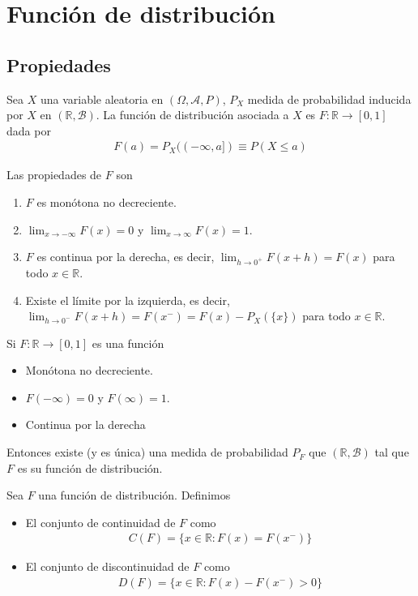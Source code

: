 \chapter{Función de distribución}

\section{Propiedades}
\begin{defi}
Sea $X$ una variable aleatoria en $(\Omega, \mathcal{A}, P)$, $P_X$ medida de probabilidad inducida por $X$ en $(\mathbb{R}, \mathcal{B})$. La función de distribución asociada a $X$ es $F: \mathbb{R} \longrightarrow [0,1]$ dada por
\begin{align*}
    F(a) = P_X((-\infty,a]) \equiv P(X \leq a)
\end{align*}
\end{defi}

\noindent Las propiedades de $F$ son
\begin{enumerate}
    \item $F$ es monótona no decreciente.
    \item $\lim_{x \to - \infty}F(x) = 0$ y $\lim_{x \to \infty}F(x) = 1$.
    \item $F$ es continua por la derecha, es decir, $\lim_{h \to 0^+}F(x+h) = F(x)$ para todo $x \in \mathbb{R}$.
    \item Existe el límite por la izquierda, es decir, $\lim_{h \to 0^-}F(x+h) = F(x^-) = F(x) - P_X(\{x\})$ para todo $x \in \mathbb{R}$.
\end{enumerate}

\begin{teo}[de correspondencia]
    Si $F: \mathbb{R} \longrightarrow [0,1]$ es una función
    \begin{itemize}
        \item Monótona no decreciente.
        \item $F(-\infty) = 0$ y $F(\infty) = 1$.
        \item Continua por la derecha
    \end{itemize}
    Entonces existe (y es única) una medida de probabilidad $P_F$ que $(\mathbb{R}, \mathcal{B})$ tal que $F$ es su función de distribución.
\end{teo}

\begin{defi}
Sea $F$ una función de distribución. Definimos
\begin{itemize}
    \item El conjunto de continuidad de $F$ como
    \begin{align*}
        C(F) = \{ x \in \mathbb{R} : F(x) = F(x^-)\}
    \end{align*}
    \item El conjunto de discontinuidad de $F$ como
    \begin{align*}
        D(F) = \{ x \in \mathbb{R} : F(x) - F(x^-) > 0\}
    \end{align*}
\end{itemize}
\end{defi}


